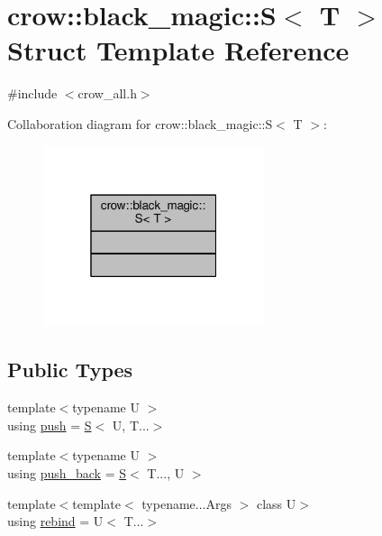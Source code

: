 \hypertarget{structcrow_1_1black__magic_1_1_s}{\section{crow\-:\-:black\-\_\-magic\-:\-:S$<$ T $>$ Struct Template Reference}
\label{structcrow_1_1black__magic_1_1_s}
}


{\ttfamily \#include $<$crow\-\_\-all.\-h$>$}



Collaboration diagram for crow\-:\-:black\-\_\-magic\-:\-:S$<$ T $>$\-:
\nopagebreak
\begin{figure}[H]
\begin{center}
\leavevmode
\includegraphics[width=184pt]{structcrow_1_1black__magic_1_1_s__coll__graph}
\end{center}
\end{figure}
\subsection*{Public Types}
\begin{DoxyCompactItemize}
\item 
{\footnotesize template$<$typename U $>$ }\\using \hyperlink{structcrow_1_1black__magic_1_1_s_a95ac106c4ecab7bb696de30b2364e784}{push} = \hyperlink{structcrow_1_1black__magic_1_1_s}{S}$<$ U, T...$>$
\item 
{\footnotesize template$<$typename U $>$ }\\using \hyperlink{structcrow_1_1black__magic_1_1_s_a046413e7ff33e4e0395926f9fc00e59a}{push\-\_\-back} = \hyperlink{structcrow_1_1black__magic_1_1_s}{S}$<$ T..., U $>$
\item 
{\footnotesize template$<$template$<$ typename...\-Args $>$ class U$>$ }\\using \hyperlink{structcrow_1_1black__magic_1_1_s_af9b6a5c99f38f9c6ae0b05b2c86b4178}{rebind} = U$<$ T...$>$
\end{DoxyCompactItemize}



